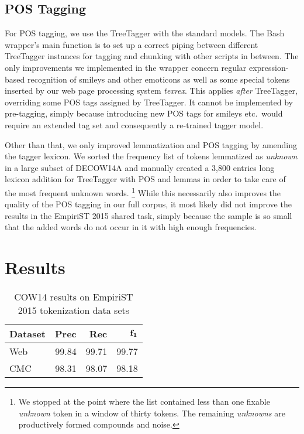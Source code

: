 \documentclass[11pt]{article}
\begin{document}
\subsection{POS Tagging}
\label{sec:postagger}

For POS tagging, we use the TreeTagger \cite{Schmid1994b,Schmid1995} with the standard models.
The Bash wrapper's main function is to set up a correct piping between different TreeTagger instances for tagging and chunking with other scripts in between.
The only improvements we implemented in the wrapper concern regular expression-based recognition of smileys and other emoticons as well as some special tokens inserted by our web page processing system \textit{texrex}.
This applies \textit{after} TreeTagger, overriding some POS tags assigned by TreeTagger.
It cannot be implemented by pre-tagging, simply because introducing new POS tags for smileys etc.\ would require an extended tag set and consequently a re-trained tagger model.

Other than that, we only improved lemmatization and POS tagging by amending the tagger lexicon.
We sorted the frequency list of tokens lemmatized as \textit{unknown} in a large subset of DECOW14A and manually created a 3,800 entries long lexicon addition for TreeTagger with POS and lemmas in order to take care of the most frequent unknown words.%
\footnote{We stopped at the point where the list contained less than one fixable \textit{unknown} token in a window of thirty tokens.
The remaining \textit{unknowns} are productively formed compounds and noise.}
While this necessarily also improves the quality of the POS tagging in our full corpus, it most likely did not improve the results in the EmpiriST 2015 shared task, simply because the sample is so small that the added words do not occur in it with high enough frequencies.

\section{Results}
\label{sec:results}

\begin{table}[!htb]
  \centering
  \begin{tabular}{|l|rrr|}
    \hline
    \textbf{Dataset} & \textbf{Prec} & \textbf{Rec} & $\mathrm{\bf f_1}$ \\
    \hline
    Web & 99.84 & 99.71 & 99.77 \\
    CMC & 98.31 & 98.07 & 98.18 \\
    \hline
  \end{tabular}
  \caption{COW14 results on EmpiriST 2015 tokenization data sets}
  \label{tab:resultstok}
\end{table}
\end{document}

